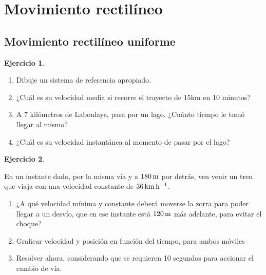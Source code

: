 \documentclass[a4paper,12pt,twoside]{book}
\newtheorem{ejercicio}{{Ejercicio}}[chapter]
\begin{document}
\section{Movimiento rectilíneo}


\subsection{Movimiento rectilíneo uniforme}

\begin{mdframed}[style=ejercicio-facil]
    \begin{ejercicio}
    \end{ejercicio}
    \begin{enumerate}
        \item Dibuje un sistema de referencia apropiado.
        \item ¿Cuál es su velocidad media si recorre el trayecto de $15 \si{\kilo\metre}$ en 10 minutos?
        \item A 7 kilómetros de Laboulaye, pasa por un lago. ¿Cuánto tiempo le tomó llegar al mismo?
        \item ¿Cuál es su velocidad instantánea al momento de pasar por el lago?
    \end{enumerate}
\end{mdframed}

\begin{mdframed}[style=ejercicio-facil]
    \begin{ejercicio}
    \end{ejercicio}
    En un instante dado, por la misma vía y a $180\,\si{\metre}$ por detrás, ven venir un tren que viaja con una velocidad constante de $36\,\si{\kilo\metre\per\hour}$.
    \begin{enumerate}
        \item ¿A qué velocidad mínima y constante deberá moverse la zorra para poder llegar a un desvío, que en ese instante está $120\,\si{\metre}$ más adelante, para evitar el choque?
        \item Graficar velocidad y posición en función del tiempo, para ambos móviles
        \item Resolver ahora, considerando que se requieren 10 segundos para accionar el cambio de vía.
    \end{enumerate}
\end{mdframed}
\end{document}
